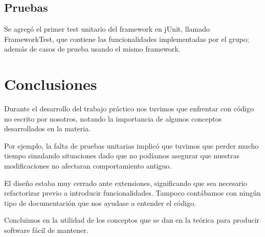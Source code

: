 \documentclass[12pt]{article}
\begin{document}
\subsection{Pruebas}
Se agregó el primer test unitario del framework en jUnit, llamado FrameworkTest, que contiene
las funcionalidades implementadas por el grupo; además de casos de prueba usando el mismo framework.

\section{Conclusiones}
Durante el desarrollo del trabajo práctico nos tuvimos que enfrentar con
código no escrito por nosotros, notando la importancia de algunos conceptos desarrollados
en la materia.

Por ejemplo, la falta de pruebas unitarias implicó que tuvimos que perder mucho tiempo 
simulando situaciones dado que no podíamos asegurar que nuestras modificaciones no afectaran
comportamiento antiguo. 

El diseño estaba muy cerrado ante extensiones, significando que sea necesario refactorizar 
previo a introducir funcionalidades. Tampoco contábamos con ningún tipo de documentación que nos 
ayudase a entender el código.

Concluimos en la utilidad de los conceptos que se dan en la teórica para producir software 
fácil de mantener.
\end{document}
